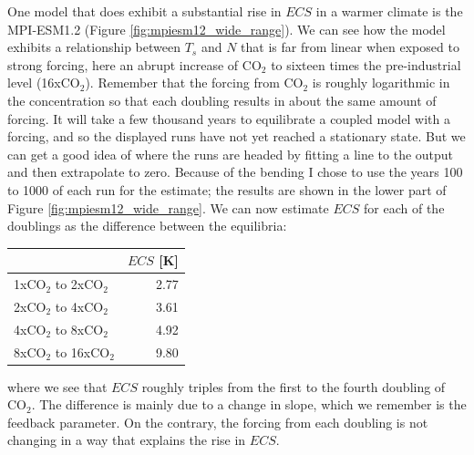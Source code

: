 \documentclass[12pt]{book}
\begin{document}
One model that does exhibit a substantial rise in $ECS$ in a warmer climate is the MPI-ESM1.2 (Figure \ref{fig:mpiesm12_wide_range}). We can see how the model exhibits a relationship between $T_s$ and $N$ that is far from linear when exposed to strong forcing, here an abrupt increase of CO$_2$ to sixteen times the pre-industrial level (16xCO$_2$). Remember that the forcing from CO$_2$ is roughly logarithmic in the concentration so that each doubling results in about the same amount of forcing. 
It will take a few thousand years to equilibrate a coupled model with a forcing, and so the displayed runs have not yet reached a stationary state. But we can get a good idea of where the runs are headed by fitting a line to the output and then extrapolate to zero. Because of the bending I chose to use the years 100 to 1000 of each run for the estimate; the results are shown in the lower part of Figure \ref{fig:mpiesm12_wide_range}. We can now estimate $ECS$ for each of the doublings as the difference between the equilibria:
\begin{center}
\begin{tabular}{l|r} 
 & $ECS$ [K]  \\
\hline
1xCO$_2$ to 2xCO$_2$     & 2.77  \\
2xCO$_2$ to 4xCO$_2$     & 3.61  \\
4xCO$_2$ to 8xCO$_2$     & 4.92  \\
8xCO$_2$ to 16xCO$_2$     & 9.80  
\end{tabular}
\end{center}
where we see that $ECS$ roughly triples from the first to the fourth doubling of CO$_2$. The difference is mainly due to a change in slope, which we remember is the feedback parameter. On the contrary, the forcing from each doubling is not changing in a way that explains the rise in $ECS$. 
\end{document}

